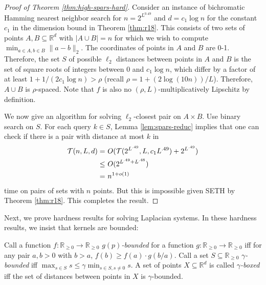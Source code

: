 \begin{proof}[Proof of Theorem \ref{thm:high-spars-hard}]
Consider an instance of bichromatic Hamming nearest neighbor search for $n = 2^{L^{0.49}}$ and $d = c_1\log n$ for the constant $c_1$ in the dimension bound in Theorem \ref{thm:r18}. This consists of two sets of points $A , B \subseteq \mathbb{R}^d$ with $|A\cup B| = n$ for which we wish to compute $\min_{a\in A, b\in B} \|a - b\|_2$. The coordinates of points in $A$ and $B$ are 0-1. Therefore, the set $S$ of possible $\ell_2$ distances between points in $A$ and $B$ is the set of square roots of integers between 0 and $c_1\log n$, which differ by a factor of at least $1 + 1/(2c_1\log n) > \rho$ (recall $\rho = 1 + (2\log (10n))/L$). Therefore, $A\cup B$ is $\rho$-spaced. Note that $f$ is also no $(\rho,L)$-multiplicatively Lipschitz by definition.

We now give an algorithm for solving $\ell_2$-closest pair on $A\times B$. Use binary search on $S$. For each query $k\in S$, Lemma \ref{lem:spars-reduc} implies that one can check if there is a pair with distance at most $k$ in 
\begin{align*}
\mathcal{T}(n,L,d)
= & ~ O(\mathcal{T}(2^{L^{.49}},L,c_1 L^{.49}) + 2^{L^{.49}}) \\
\le & ~ O(2^{L^{.49} + L^{.48}}) \\ 
= & ~ n^{1 + o(1)}
\end{align*}
time on pairs of sets with $n$ points. But this is impossible given {\sf SETH} by Theorem \ref{thm:r18}. This completes the result.
\end{proof}

Next, we prove hardness results for solving Laplacian systems. In these hardness results, we insist that kernels are bounded:

\begin{definition}
Call a function $f:\mathbb{R}_{\ge 0}\rightarrow \mathbb{R}_{\ge 0}$ \emph{$g(p)$-bounded} for a function $g:\mathbb{R}_{\ge 0}\rightarrow \mathbb{R}_{\ge 0}$ iff for any pair $a,b > 0$ with $b > a$, $f(b) \ge f(a) \cdot g(b/a)$. Call a set $S\subseteq \mathbb{R}_{\ge 0}$ \emph{$\gamma$-bounded} iff $\max_{s\in S} s \le \gamma \min_{s\in S,s\ne 0} s$. A set of points $X\subseteq \mathbb{R}^d$ is called \emph{$\gamma$-boxed} iff the set of distances between points in $X$ is $\gamma$-bounded.
\end{definition}

